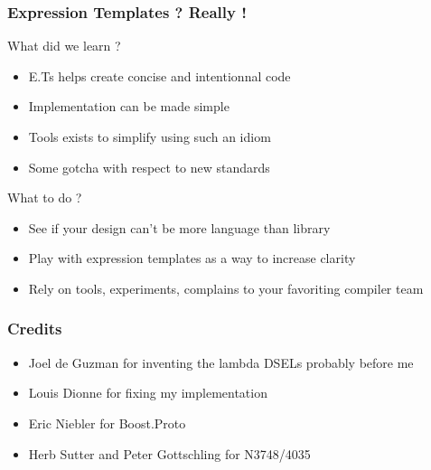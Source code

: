 
\begin{frame}
\frametitle{Expression Templates ? Really !}
\begin{block}{What did we learn ?}
\begin{itemize}
\item E.Ts helps create concise and intentionnal code
\item Implementation can be made simple
\item Tools exists to simplify using such an idiom
\item Some gotcha with respect to new standards
\end{itemize}
\end{block}{}

\begin{block}{What to do ?}
\begin{itemize}
\item See if your design can't be more language than library
\item Play with expression templates as a way to increase clarity
\item Rely on tools, experiments, complains to your favoriting compiler team
\end{itemize}
\end{block}{}
\end{frame}

\frame
{
  \frametitle{Credits}
  \begin{itemize}
  \item Joel de Guzman for inventing the lambda DSELs probably before me
  \item Louis Dionne for fixing my implementation
  \item Eric Niebler for Boost.Proto
  \item Herb Sutter and Peter Gottschling for N3748/4035
  \end{itemize}
}



